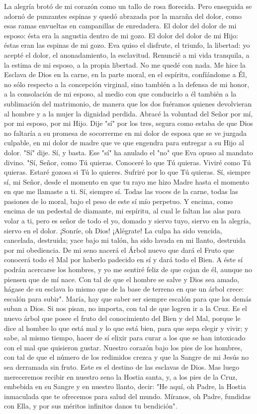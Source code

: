 \documentclass[12pt]{book} %
\begin{document}
La alegría brotó de mi corazón como un tallo de rosa florecida. Pero enseguida se adornó de punzantes espinas y quedó abrazada por la maraña del dolor, como esas ramas envueltas en campanillas de enredadera. El dolor del dolor de mi esposo: ésta era la angustia dentro de mi gozo. El dolor del dolor de mi Hijo: éstas eran las espinas de mi gozo. 
Eva quiso el disfrute, el triunfo, la libertad: yo acepté el dolor, el anonadamiento, la esclavitud. Renuncié a mi vida 
tranquila, a la estima de mi esposo, a la propia libertad. No me quedé con nada. Me hice la Esclava de Dios en la carne, en la parte moral, en el espíritu, confíándome a Él, no sólo respecto a la concepción virginal, sino también a la defensa de mi honor, a la consolación de mi esposo, al medio con que conducirlo a él también a la sublimación del matrimonio, de manera que los dos fuéramos quienes devolvieran al hombre y a la mujer la dignidad perdida. 
Abracé la voluntad del Señor por mí, por mi esposo, por mi Hijo. Dije "sí" por los tres, segura como estaba de que Dios no faltaría a su promesa de socorrerme en mi dolor de esposa que se ve juzgada culpable, en mi dolor de madre que ve que engendra para entregar a su Hijo al dolor. 
"Sí" dije. Sí, y basta. Ese "sí" ha anulado el "no" que Eva opuso al mandato divino. "Sí, Señor, como Tú quieras. Conoceré 
lo que Tú quieras. Viviré como Tú quieras. Estaré gozosa si Tú lo quieres. Sufriré por lo que Tú quieras. Sí, siempre sí, mi Señor, desde el momento en que tu rayo me hizo Madre hasta el momento en que me llamaste a ti. Sí, siempre sí. Todas las voces de la carne, todas las pasiones de lo moral, bajo el peso de este sí mío perpetuo. Y encima, como encima de un pedestal de diamante, mi espíritu, al cual le faltan las alas para volar a ti, pero es señor de todo el yo, domado y siervo tuyo, siervo en la alegría, siervo en el dolor. ¡Sonríe, oh Dios! ¡Alégrate! La culpa ha sido vencida, cancelada, destruida; yace bajo mi talón, ha sido lavada en mi llanto, destruida por mi obediencia. De mi seno nacerá el Árbol nuevo que dará el Fruto que conocerá todo el Mal por haberlo padecido en sí y dará todo el Bien. A éste sí podrán acercarse los hombres, y yo me sentiré feliz de que cojan de él, aunque no piensen que de mí nace. Con tal de que el hombre se salve y Dios sea amado, hágase de su esclava lo mismo que de la base de terreno en que un árbol crece: escalón para subir". 
María, hay que saber ser siempre escalón para que los demás suban a Dios. Si nos pisan, no importa, con tal de que 
logren ir a la Cruz. Es el nuevo árbol que posee el fruto del conocimiento del Bien y del Mal, porque le dice al hombre lo que está mal y lo que está bien, para que sepa elegir y vivir; y sabe, al mismo tiempo, hacer de sí elixir para curar a los que se han intoxicado con el mal que quisieron gustar. Nuestro corazón bajo los pies de los hombres, con tal de que el número de los redimidos crezca y que la Sangre de mi Jesús no sea derramada sin fruto. Este es el destino de las esclavas de Dios. Mas luego mereceremos recibir en nuestro seno la Hostia santa, y, a los pies de la Cruz, embebida en su Sangre y en nuestro llanto, decir: "He aquí, oh Padre, la Hostia inmaculada que te ofrecemos para salud del mundo. Míranos, oh Padre, fundidas con Ella, y por sus méritos infinitos danos tu bendición". 
\end{document}
